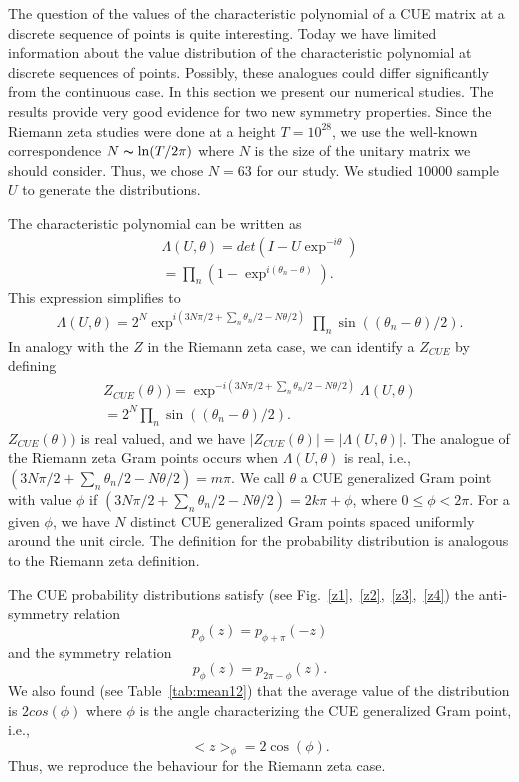 \documentclass[twoside]{article}
\begin{document}
The question of the values of the characteristic polynomial of a CUE matrix 
at a discrete sequence of points is quite interesting. 
Today we have limited information 
about the value distribution of the characteristic polynomial at discrete sequences of points. 
Possibly, these analogues could differ significantly from the continuous case. 
In this section we present our numerical studies. The results provide very good evidence 
for two new symmetry properties. Since the Riemann zeta studies were done at a
height $T = 10^{28}$, we use the well-known correspondence $N \thicksim \ln(T/2\pi)$ where $N$ 
is the size of the unitary matrix we should consider. Thus, we chose $N = 63$ for our
study. We studied $10000$ sample $U$ to generate the distributions.

The characteristic polynomial can be written as
\begin{align}
\Lambda(U, \theta) = det(I-U\exp^{-i\theta})\\
                   = \prod_{n}(1-\exp^{i(\theta_{n} - \theta)}).
\label{eq:cueDet}
\end{align}
This expression simplifies to
\begin{align}
\Lambda(U, \theta)  = 2^N\exp^{i(3N\pi/2 + \sum_{n}\theta_{n}/2 - N\theta/2)}\prod_{n}\sin((\theta_{n} - \theta)/2).
\label{eq:cueExpanded}
\end{align}
In analogy with the $Z$ in the Riemann zeta case, we can identify a $Z_{CUE}$ by defining
\begin{align}
Z_{CUE}(\theta))    = \exp^{-i(3N\pi/2 + \sum_{n}\theta_{n}/2 - N\theta/2)}\Lambda(U, \theta)\\
                    = 2^N\prod_{n}\sin((\theta_{n} - \theta)/2).
\label{eq:cueZ}
\end{align}
$Z_{CUE}(\theta))$ is real valued,
and we have $|Z_{CUE}(\theta)| = |\Lambda(U, \theta)|$. The analogue of the Riemann zeta 
Gram points occurs when $\Lambda(U, \theta)$ is real, i.e., 
$(3N\pi/2 + \sum_{n}\theta_{n}/2 - N\theta/2) = m\pi$.
We call $\theta$  a CUE generalized Gram point with value $\phi$  if
$(3N\pi/2 + \sum_{n}\theta_{n}/2 - N\theta/2) = 2k\pi + \phi$, where $0 \le \phi < 2\pi$.
For a given $\phi$, we have $N$ distinct CUE generalized Gram points spaced uniformly
around the unit circle.
The definition for the probability distribution is analogous to the Riemann zeta definition.

The CUE probability distributions satisfy (see Fig.~\ref{z1},~\ref{z2},~\ref{z3},~\ref{z4}) 
the anti-symmetry relation 
\begin{equation}
p_{\phi}(z) = p_{\phi+\pi}(-z)
\label{eq:antisym}
\end{equation}
and the symmetry relation 
\begin{equation}
p_{\phi}(z) = p_{2\pi-\phi}(z).
\label{eq:sym}
\end{equation}
We also found  (see Table~\ref{tab:mean12}) that the average value of the 
distribution is $2cos(\phi)$ where $\phi$
is the angle characterizing the CUE generalized Gram point, i.e., 
\begin{equation}
<z>_{\phi} = 2\cos(\phi).
\label{eq:cosphi}
\end{equation}
Thus, we reproduce the behaviour 
for the Riemann zeta case.
\end{document}

